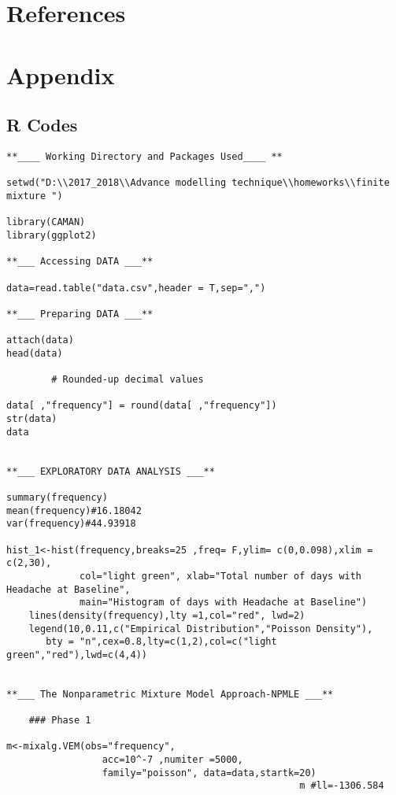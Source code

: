 \documentclass[a4paper, 12pt]{article}
\begin{document}
\section{References}


\newpage

\section{Appendix}
\subsection{R Codes}

\begin{verbatim}
**____ Working Directory and Packages Used____ **

setwd("D:\\2017_2018\\Advance modelling technique\\homeworks\\finite mixture ")

library(CAMAN)
library(ggplot2)

**___ Accessing DATA ___**

data=read.table("data.csv",header = T,sep=",")

**___ Preparing DATA ___**

attach(data)
head(data)

        # Rounded-up decimal values

data[ ,"frequency"] = round(data[ ,"frequency"])
str(data)
data


**___ EXPLORATORY DATA ANALYSIS ___**

summary(frequency)
mean(frequency)#16.18042
var(frequency)#44.93918

hist_1<-hist(frequency,breaks=25 ,freq= F,ylim= c(0,0.098),xlim = c(2,30),
             col="light green", xlab="Total number of days with Headache at Baseline", 
             main="Histogram of days with Headache at Baseline")
    lines(density(frequency),lty =1,col="red", lwd=2)
    legend(10,0.11,c("Empirical Distribution","Poisson Density"),
       bty = "n",cex=0.8,lty=c(1,2),col=c("light green","red"),lwd=c(4,4))


**___ The Nonparametric Mixture Model Approach-NPMLE ___**

    ### Phase 1

m<-mixalg.VEM(obs="frequency",
                 acc=10^-7 ,numiter =5000,
                 family="poisson", data=data,startk=20)
                                                    m #ll=-1306.584



\end{verbatim}
\end{document}

